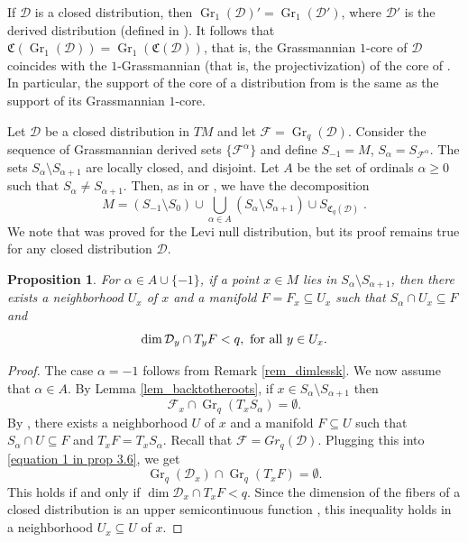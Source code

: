 \documentclass[12pt]{amsart}
\newtheorem{pro}[theorem]{Proposition}
\numberwithin{equation}{section}
{\theoremstyle{definition}
\newtheorem{remark}[theorem]{Remark}
}
\DeclareMathOperator{\Grass}{Gr}
\newcommand{\Gr}{\Grass}
\newcommand{\D}{\mathcal{D}}
\newcommand{\Coreof}{\mathfrak{C}}
\begin{document}
\begin{remark}
If $\mathcal{D}$ is a closed distribution, then $\Gr_1(\mathcal{D})'=\Gr_1(\mathcal{D}')$, where $\mathcal{D}'$ is the derived distribution (defined in \cite{DaMo21}). It follows that $\Coreof(\Gr_1(\mathcal{D}))=\Gr_1(\Coreof(\mathcal{D}))$, that is, the Grassmannian $1$-core of $\mathcal{D}$ coincides with the $1$-Grassmannian (that is, the projectivization)
of the core of \cite{DaMo21}. In particular, the support of the core of a distribution from \cite{DaMo21} is the same as the support of its Grassmannian $1$-core. 
    \end{remark}

Let $\D$ be a closed distribution in $TM$ and let $\mathcal{F}=\Gr_q(\D)$. Consider the sequence of Grassmannian derived sets $\{\mathcal{F}^\alpha\}$ and define $S_{-1}=M$, $S_\alpha=S_{\mathcal{F}^\alpha}$. The sets $S_\alpha\setminus S_{\alpha+1}$ are locally closed, and disjoint. Let $A$ be the set of ordinals $\alpha\geq 0$ such that $S_\alpha\neq S_{\alpha+1}$. Then, as in \cite[Lemma 2.8]{Tr22} or \cite[equation (3.1)]{Tr22}, we have the decomposition
\begin{equation}\label{eq_decomp}M=(S_{-1}\setminus S_0)\cup \bigcup_{\alpha\in A} (S_\alpha\setminus S_{\alpha+1})\cup S_{\Coreof_q(\mathcal{D})}\;.\end{equation}
We note that \cite[Lemma 2.8]{Tr22} was proved for the Levi null distribution, but its proof remains true for any closed distribution $\mathcal{D}$.
\begin{pro}\label{pro_holdimlessq}
For $\alpha\in A\cup\{-1\}$, if a point $x\in M$ lies in $S_{\alpha}\setminus S_{\alpha+1}$, then there exists a neighborhood $U_x$ of $x$ and a manifold $F=F_x\subseteq U_x$ such that  $S_\alpha\cap U_x\subseteq F$ and 
\begin{equation}\label{dimensional inequality}
\dim  \D_y \cap T_yF < q, \hbox{ for all } y\in U_x.
\end{equation}
  
\end{pro}
    
\begin{proof}
    The case $\alpha=-1$ follows from Remark \ref{rem_dimlessk}. We now assume that $\alpha \in A$. By Lemma \ref{lem_backtotheroots}, if $x\in S_\alpha\setminus S_{\alpha+1}$ then 
    \begin{equation}\label{equation 1 in prop 3.6}
    \mathcal{F}_x\cap \Gr_q(T_xS_{\alpha})=\emptyset.
    \end{equation} By \cite[Proposition 2.6(c)]{DaMo21}, there exists a neighborhood $U$ of $x$ and a manifold $F\subseteq U$ such that $S_\alpha\cap U\subseteq F$ and $T_xF=T_xS_{\alpha}$.  Recall that $\mathcal{F} = Gr_q(\mathcal{D})$.  Plugging this into \eqref{equation 1 in prop 3.6}, we get
    $$
    \Gr_q(\D_x)\cap \Gr_q(T_xF)=\emptyset.
    $$
    This holds if and only if $\dim \D_x\cap T_xF<q$. Since the dimension of the fibers  of a closed distribution is an  upper semicontinuous function \cite[Proposition 2.3]{DaMo21}, this inequality holds in a neighborhood $U_x\subseteq U$ of $x$.
\end{proof}
\end{document}
